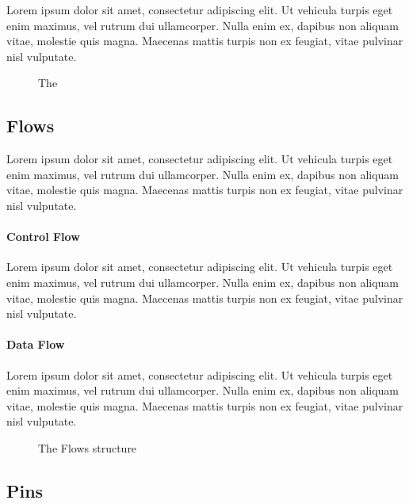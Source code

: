 Lorem ipsum dolor sit amet, consectetur adipiscing elit. Ut vehicula turpis eget enim maximus, vel rutrum dui ullamcorper. Nulla enim ex, dapibus non aliquam vitae, molestie quis magna. Maecenas mattis turpis non ex feugiat, vitae pulvinar nisl vulputate.

\begin{figure}[!ht]
\centering

\caption{The }
\label{fig:composite_activity}
\end{figure}

\subsection{Flows}\label{ssec:flows}

Lorem ipsum dolor sit amet, consectetur adipiscing elit. Ut vehicula turpis eget enim maximus, vel rutrum dui ullamcorper. Nulla enim ex, dapibus non aliquam vitae, molestie quis magna. Maecenas mattis turpis non ex feugiat, vitae pulvinar nisl vulputate.

\paragraph{Control Flow}

Lorem ipsum dolor sit amet, consectetur adipiscing elit. Ut vehicula turpis eget enim maximus, vel rutrum dui ullamcorper. Nulla enim ex, dapibus non aliquam vitae, molestie quis magna. Maecenas mattis turpis non ex feugiat, vitae pulvinar nisl vulputate.

\paragraph{Data Flow}\label{par:data_flow}

Lorem ipsum dolor sit amet, consectetur adipiscing elit. Ut vehicula turpis eget enim maximus, vel rutrum dui ullamcorper. Nulla enim ex, dapibus non aliquam vitae, molestie quis magna. Maecenas mattis turpis non ex feugiat, vitae pulvinar nisl vulputate.

\begin{figure}[!ht]
	\centering
	
	\caption{The Flows structure}
	\label{fig:flows}
\end{figure}

\subsection{Pins}\label{ssec:pins}


